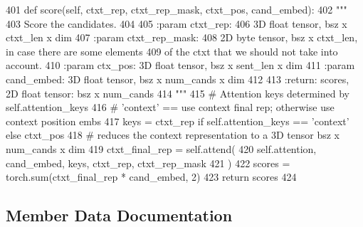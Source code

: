 \begin{DoxyCode}
401     \textcolor{keyword}{def }score(self, ctxt\_rep, ctxt\_rep\_mask, ctxt\_pos, cand\_embed):
402         \textcolor{stringliteral}{"""}
403 \textcolor{stringliteral}{        Score the candidates.}
404 \textcolor{stringliteral}{}
405 \textcolor{stringliteral}{        :param ctxt\_rep:}
406 \textcolor{stringliteral}{            3D float tensor, bsz x ctxt\_len x dim}
407 \textcolor{stringliteral}{        :param ctxt\_rep\_mask:}
408 \textcolor{stringliteral}{            2D byte tensor, bsz x ctxt\_len, in case there are some elements}
409 \textcolor{stringliteral}{            of the ctxt that we should not take into account.}
410 \textcolor{stringliteral}{        :param ctx\_pos: 3D float tensor, bsz x sent\_len x dim}
411 \textcolor{stringliteral}{        :param cand\_embed: 3D float tensor, bsz x num\_cands x dim}
412 \textcolor{stringliteral}{}
413 \textcolor{stringliteral}{        :return: scores, 2D float tensor: bsz x num\_cands}
414 \textcolor{stringliteral}{        """}
415         \textcolor{comment}{# Attention keys determined by self.attention\_keys}
416         \textcolor{comment}{# 'context' == use context final rep; otherwise use context position embs}
417         keys = ctxt\_rep \textcolor{keywordflow}{if} self.attention\_keys == \textcolor{stringliteral}{'context'} \textcolor{keywordflow}{else} ctxt\_pos
418         \textcolor{comment}{# reduces the context representation to a 3D tensor bsz x num\_cands x dim}
419         ctxt\_final\_rep = self.attend(
420             self.attention, cand\_embed, keys, ctxt\_rep, ctxt\_rep\_mask
421         )
422         scores = torch.sum(ctxt\_final\_rep * cand\_embed, 2)
423         \textcolor{keywordflow}{return} scores
424 
\end{DoxyCode}


\subsection{Member Data Documentation}
\mbox{\label{classparlai_1_1agents_1_1transformer_1_1polyencoder_1_1PolyEncoderModule_a8fab02ef33d1e1ee413e4bcbe25aa03b}} 
